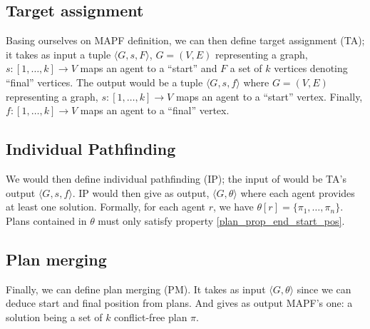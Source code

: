\documentclass{llncs}
\begin{document}
\subsection{Target assignment}
Basing ourselves on MAPF definition, we can then define target assignment (TA)\cite{classical_mapf}\cite{anonymous_mapf}; it takes as input a tuple \(\langle G,s,F \rangle\), \(G=(V,E)\) representing a graph, \(s : [1,\ldots,k] \rightarrow V\) maps an agent to a ``start'' and \(F\) a set of \(k\) vertices denoting ``final'' vertices.  The output would be a tuple \(\langle G,s,f \rangle \) where \(G=(V,E)\) representing a graph, \(s : [1,\ldots,k] \rightarrow V\) maps an agent to a ``start'' vertex. Finally,  \(f : [1,\ldots,k] \rightarrow V\) maps an agent to a ``final'' vertex.

\subsection{Individual Pathfinding}
We would then define individual pathfinding (IP); the input of would be TA's output \(\langle G,s,f \rangle \). IP would then give as output, \(\langle G, \theta \rangle \) where each agent provides at least one solution. Formally, for each agent \(r\), we have \( \theta[r] = \{\pi_1,\ldots,\pi_n\}\). Plans contained in \(\theta\) must only satisfy property \@\ref{plan_prop_end_start_pos}.

\subsection{Plan merging}
Finally, we can define plan merging (PM). It takes as input \(\langle G, \theta \rangle \) since we can deduce start and final position from plans. And gives as output MAPF's one:  a solution being a set of \(k\) conflict-free plan \(\pi\). 





    
\end{document}
